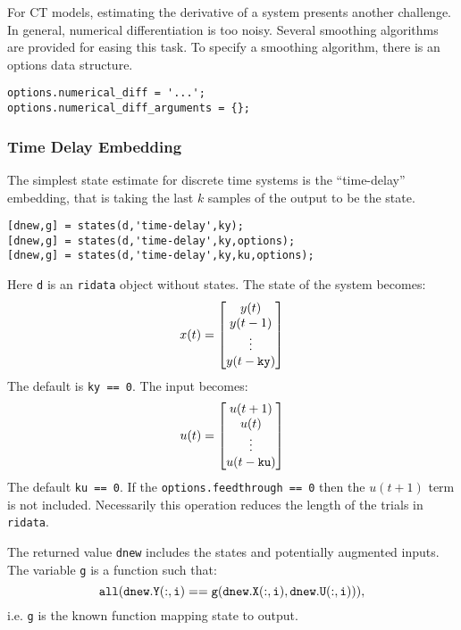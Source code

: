 \documentclass{article}
\begin{document}

For CT models, estimating the derivative of a system presents another
challenge.  In general, numerical differentiation is too noisy.
Several smoothing algorithms are provided for easing this task.  To
specify a smoothing algorithm, there is an options data structure.

\begin{verbatim}
options.numerical_diff = '...';
options.numerical_diff_arguments = {};
\end{verbatim}


\subsubsection{Time Delay Embedding}
The simplest state estimate for discrete time systems is the
``time-delay'' embedding, that is taking the last $k$ samples of the
output to be the state.
\begin{verbatim}
[dnew,g] = states(d,'time-delay',ky);
[dnew,g] = states(d,'time-delay',ky,options);
[dnew,g] = states(d,'time-delay',ky,ku,options);
\end{verbatim}
Here {\tt d} is an {\tt ridata} object without states.
The state of the system becomes:
$$ x(t) = \begin{bmatrix} y(t) \\ y(t-1) \\ \vdots \\ y(t-{\tt ky})\end{bmatrix}$$
The default is {\tt ky == 0}.  The input becomes:
$$ u(t) = \begin{bmatrix} u(t+1) \\ u(t) \\ \vdots \\ u(t-{\tt ku})\end{bmatrix}$$
The default {\tt ku == 0}.  If the {\tt options.feedthrough == 0} then
the $u(t+1)$ term is not included.
Necessarily this operation reduces the
length of the trials in {\tt ridata}.

The returned value {\tt dnew} includes the states and potentially
augmented inputs.  The variable {\tt g} is a function such that:
$${\tt all(dnew.Y(:,i) == g(dnew.X(:,i),dnew.U(:,i))}),$$
i.e. {\tt g} is the known function
mapping state to output.
\end{document}
